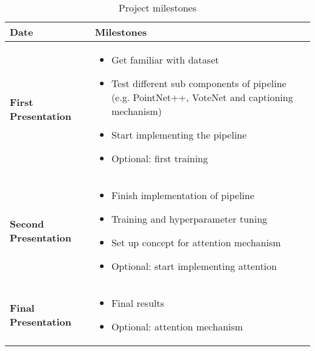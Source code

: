 \documentclass[10pt,twocolumn,letterpaper]{article}
\begin{document}

\begin{table*}
	\centering
	\begin{tabularx}{\textwidth}{l|l}
	\textbf{Date} & \textbf{Milestones} \\
	\hline
	\textbf{First Presentation} & 
	\begin{minipage}[t]{\textwidth}
		\begin{itemize}[nosep, wide=0pt, leftmargin=*, after=\strut]
			\item Get familiar with dataset
			\item Test different sub components of pipeline (e.g. PointNet++, VoteNet and captioning mechanism)
			\item Start implementing the pipeline
			\item Optional: first training
		\end{itemize}  
	\end{minipage}\\
	\hline
	\textbf{Second Presentation} & 
	\begin{minipage}[t]{\linewidth}
		\begin{itemize}[nosep, wide=0pt, leftmargin=*, after=\strut]
			\item Finish implementation of pipeline
			\item Training and hyperparameter tuning
			\item Set up concept for attention mechanism
			\item Optional: start implementing attention
		\end{itemize}  
	\end{minipage}\\
	\hline
	\textbf{Final Presentation} & 
	\begin{minipage}[t]{\linewidth}
		\begin{itemize}[nosep, wide=0pt, leftmargin=*, after=\strut]
			\item Final results
			\item Optional: attention mechanism
		\end{itemize}  
	\end{minipage}\\
	\end{tabularx}
	\caption{Project milestones}
	\label{tab:milestones}
\end{table*}

{\small


}
\end{document}
